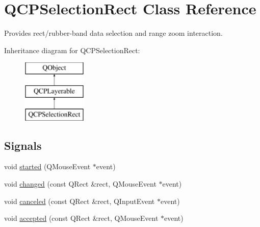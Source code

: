 \hypertarget{class_q_c_p_selection_rect}{}\section{Q\+C\+P\+Selection\+Rect Class Reference}
\label{class_q_c_p_selection_rect}


Provides rect/rubber-\/band data selection and range zoom interaction.  


Inheritance diagram for Q\+C\+P\+Selection\+Rect\+:\begin{figure}[H]
\begin{center}
\leavevmode
\includegraphics[height=3.000000cm]{class_q_c_p_selection_rect}
\end{center}
\end{figure}
\subsection*{Signals}
\begin{DoxyCompactItemize}
\item 
void \mbox{\hyperlink{class_q_c_p_selection_rect_a7b7162d19f4f2174d3644ff1a5d335aa}{started}} (Q\+Mouse\+Event $\ast$event)
\item 
void \mbox{\hyperlink{class_q_c_p_selection_rect_a1bab11026bca52740c2e6682623e6964}{changed}} (const Q\+Rect \&rect, Q\+Mouse\+Event $\ast$event)
\item 
void \mbox{\hyperlink{class_q_c_p_selection_rect_aeb82009393c90130102dccf36477b906}{canceled}} (const Q\+Rect \&rect, Q\+Input\+Event $\ast$event)
\item 
void \mbox{\hyperlink{class_q_c_p_selection_rect_a15a43542e1f7b953a44c260b419e6d2c}{accepted}} (const Q\+Rect \&rect, Q\+Mouse\+Event $\ast$event)
\end{DoxyCompactItemize}
